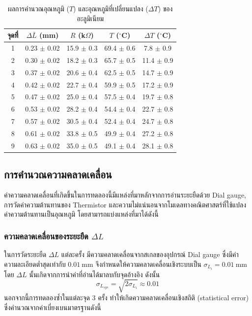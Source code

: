 \documentclass[11pt,a4paper]{article}
\begin{document}
\begin{table}[htbp]
\centering
\caption{ผลการคำนวณอุณหภูมิ ($T$) และอุณหภูมิที่เปลี่ยนแปลง ($\Delta T$) ของอะลูมิเนียม}
\renewcommand{\arraystretch}{1.2}
\begin{tabular}{|c|c|c|c|c|}
\hline
จุดที่ 
& $\Delta \bar L$ (mm)
& $R$ (k$\Omega$)
& $T$ ($^\circ$C)
& $\Delta T$ ($^\circ$C) \\
\hline
1 & 0.23 $\pm$ 0.02 & 15.9 $\pm$ 0.3 & 69.4 $\pm$ 0.6 & 7.8 $\pm$ 0.9 \\
2 & 0.30 $\pm$ 0.02 & 18.2 $\pm$ 0.3 & 65.7 $\pm$ 0.5 & 11.4 $\pm$ 0.9 \\
3 & 0.37 $\pm$ 0.02 & 20.6 $\pm$ 0.4 & 62.5 $\pm$ 0.5 & 14.7 $\pm$ 0.9 \\
4 & 0.42 $\pm$ 0.02 & 22.7 $\pm$ 0.4 & 59.9 $\pm$ 0.5 & 17.2 $\pm$ 0.9 \\
5 & 0.47 $\pm$ 0.02 & 25.0 $\pm$ 0.4 & 57.5 $\pm$ 0.4 & 19.7 $\pm$ 0.8 \\
6 & 0.53 $\pm$ 0.02 & 28.2 $\pm$ 0.4 & 54.4 $\pm$ 0.4 & 22.7 $\pm$ 0.8 \\
7 & 0.57 $\pm$ 0.02 & 30.5 $\pm$ 0.4 & 52.4 $\pm$ 0.4 & 24.7 $\pm$ 0.8 \\
8 & 0.61 $\pm$ 0.02 & 33.8 $\pm$ 0.5 & 49.9 $\pm$ 0.4 & 27.2 $\pm$ 0.8 \\
9 & 0.63 $\pm$ 0.02 & 35.0 $\pm$ 0.5 & 49.1 $\pm$ 0.4 & 28.1 $\pm$ 0.8 \\
\hline
\end{tabular}
\end{table}




\newpage
\subsection{การคำนวณความคลาดเคลื่อน}

ค่าความคลาดเคลื่อนที่เกิดขึ้นในการทดลองนี้มีแหล่งที่มาหลักจากการอ่านระยะยืดด้วย Dial gauge, การวัดค่าความต้านทานของ Thermistor และความไม่แน่นอนจากโมเดลทางคณิตศาสตร์ที่ใช้แปลงค่าความต้านทานเป็นอุณหภูมิ โดยสามารถแบ่งแหล่งที่มาได้ดังนี้

\subsubsection{ความคลาดเคลื่อนของระยะยืด $\Delta L$}

ในการวัดระยะยืด $\Delta L$ แต่ละครั้ง มีความคลาดเคลื่อนจากสเกลของอุปกรณ์ Dial gauge ซึ่งมีค่าความละเอียดต่ำสุดเท่ากับ $0.01\ \text{mm}$ จึงกำหนดให้ความคลาดเคลื่อนเชิงระบบเป็น $\sigma_{L_i} = 0.01\ \text{mm}$ โดย $\Delta L$ นั้นเกิดจากการนำค่าที่อ่านได้มาลบกับจุดอ้างอิง ดังนั้น
\[
\sigma_{L_{sys}} = \sqrt{2\sigma_{L_i}} \approx 0.01
\]
นอกจากนี้การทดลองซ้ำในแต่ละจุด $3$ ครั้ง ทำให้เกิดความคลาดเคลื่อนเชิงสถิติ (statistical error) ซึ่งคำนวณจากค่าเบี่ยงเบนมาตรฐานดังนี้
\end{document}
